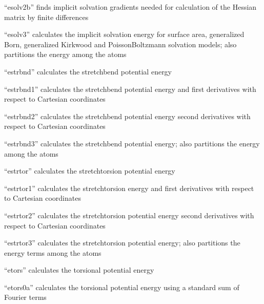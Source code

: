 \documentclass[letterpaper,11pt,english]{sphinxmanual}
\begin{document}
“esolv2b” finds implicit solvation gradients needed for
calculation of the Hessian matrix by finite differences


“esolv3” calculates the implicit solvation energy for
surface area, generalized Born, generalized Kirkwood
and Poisson\sphinxhyphen{}Boltzmann solvation models; also partitions
the energy among the atoms


“estrbnd” calculates the stretch\sphinxhyphen{}bend potential energy


“estrbnd1” calculates the stretch\sphinxhyphen{}bend potential energy and
first derivatives with respect to Cartesian coordinates


“estrbnd2” calculates the stretch\sphinxhyphen{}bend potential energy
second derivatives with respect to Cartesian coordinates


“estrbnd3” calculates the stretch\sphinxhyphen{}bend potential energy;
also partitions the energy among the atoms


“estrtor” calculates the stretch\sphinxhyphen{}torsion potential energy


“estrtor1” calculates the stretch\sphinxhyphen{}torsion energy and first
derivatives with respect to Cartesian coordinates


“estrtor2” calculates the stretch\sphinxhyphen{}torsion potential energy
second derivatives with respect to Cartesian coordinates


“estrtor3” calculates the stretch\sphinxhyphen{}torsion potential energy;
also partitions the energy terms among the atoms


“etors” calculates the torsional potential energy


“etors0a” calculates the torsional potential energy
using a standard sum of Fourier terms
\end{document}
